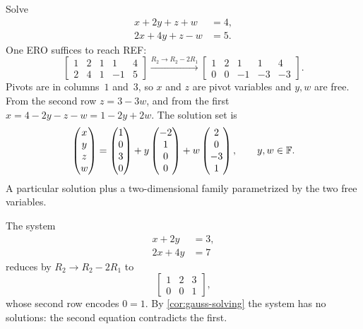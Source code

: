 \begin{example}
\label{ex:gauss-parametric}
Solve
\[
  \begin{aligned}
    x + 2y + z + w &= 4, \\
    2x + 4y + z - w &= 5.
  \end{aligned}
\]
One ERO suffices to reach REF:
\[
  \left[\begin{array}{rrrr|r}
    1 & 2 &  1 &  1 & 4 \\
    2 & 4 &  1 & -1 & 5
  \end{array}\right]
  \xrightarrow{R_2 \to R_2 - 2R_1}
  \left[\begin{array}{rrrr|r}
    1 & 2 &  1 &  1 & 4 \\
    0 & 0 & -1 & -3 & -3
  \end{array}\right].
\]
Pivots are in columns~$1$ and~$3$, so $x$ and $z$ are pivot variables
and $y, w$ are free. From the second row $z = 3 - 3w$, and from the
first $x = 4 - 2y - z - w = 1 - 2y + 2w$. The solution set is
\[
  \begin{pmatrix} x \\ y \\ z \\ w \end{pmatrix}
  =
  \begin{pmatrix} 1 \\ 0 \\ 3 \\ 0 \end{pmatrix}
  + y \begin{pmatrix} -2 \\ 1 \\ 0 \\ 0 \end{pmatrix}
  + w \begin{pmatrix} 2 \\ 0 \\ -3 \\ 1 \end{pmatrix},
  \qquad y, w \in \mathbb{F}.
\]
A particular solution plus a two-dimensional family parametrized by the
two free variables.
\end{example}

\begin{example}
\label{ex:gauss-inconsistent}
The system
\[
  \begin{aligned}
    x + 2y &= 3, \\
    2x + 4y &= 7
  \end{aligned}
\]
reduces by $R_2 \to R_2 - 2R_1$ to
\[
  \left[\begin{array}{rr|r}
    1 & 2 & 3 \\
    0 & 0 & 1
  \end{array}\right],
\]
whose second row encodes $0 = 1$. By \cref{cor:gauss-solving} the
system has no solutions: the second equation contradicts the first.
\end{example}

